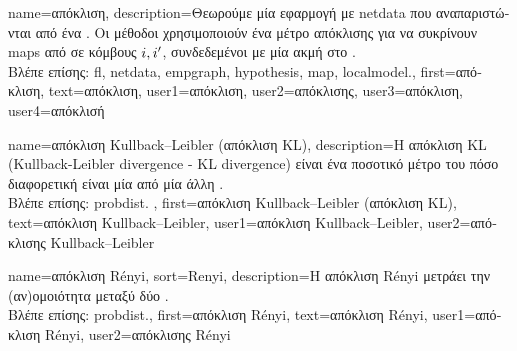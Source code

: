 {name={\foreignlanguage{greek}{απόκλιση}},
	description={\foreignlanguage{greek}{Θεωρούμε μία εφαρμογή} 
		 \foreignlanguage{greek}{με} \gls{netdata} \foreignlanguage{greek}{που αναπαριστώνται από ένα}
		. \foreignlanguage{greek}{Οι μέθοδοι}  \foreignlanguage{greek}{χρησιμοποιούν 
		ένα μέτρο απόκλισης για να συκρίνουν} \gls{map}s  \foreignlanguage{greek}{από}  
		\foreignlanguage{greek}{σε κόμβους} $i,i'$, \foreignlanguage{greek}{συνδεδεμένοι με μία ακμή στο} . \\
		\foreignlanguage{greek}{Βλέπε επίσης:} \gls{fl}, \gls{netdata}, \gls{empgraph}, \gls{hypothesis}, \gls{map}, \gls{localmodel}.},
	first={\foreignlanguage{greek}{απόκλιση}},
	text={\foreignlanguage{greek}{απόκλιση}},
	user1={\foreignlanguage{greek}{απόκλιση}}, %
	user2={\foreignlanguage{greek}{απόκλισης}}, %
	user3={\foreignlanguage{greek}{απόκλιση}}, %
	user4={\foreignlanguage{greek}{απόκλισή}} %
}

 {name={\foreignlanguage{greek}{απόκλιση} Kullback–Leibler (\foreignlanguage{greek}{απόκλιση} KL)}, 
 	description={\foreignlanguage{greek}{Η απόκλιση} 
		KL (Kullback-Leibler divergence - KL divergence) \foreignlanguage{greek}{είναι ένα ποσοτικό μέτρο του πόσο διαφορετική 
		είναι μία}  \foreignlanguage{greek}{από μία άλλη} \cite{coverthomas}.\\
		\foreignlanguage{greek}{Βλέπε επίσης:} \gls{probdist}. },
 	first={\foreignlanguage{greek}{απόκλιση} Kullback–Leibler (\foreignlanguage{greek}{απόκλιση} KL)},
	text={\foreignlanguage{greek}{απόκλιση} Kullback–Leibler},
	user1={\foreignlanguage{greek}{απόκλιση} Kullback–Leibler}, %
  	user2={\foreignlanguage{greek}{απόκλισης} Kullback–Leibler} %
}

{name={\foreignlanguage{greek}{απόκλιση} R\'enyi}, 
	sort={Renyi},
	description={\foreignlanguage{greek}{Η απόκλιση} R\'enyi 
		\foreignlanguage{greek}{μετράει την (αν)ομοιότητα μεταξύ δύο}  \cite{RenyiInfo95}.\\
		\foreignlanguage{greek}{Βλέπε επίσης:} \gls{probdist}.}, 
	first={\foreignlanguage{greek}{απόκλιση} R\'enyi},
	text={\foreignlanguage{greek}{απόκλιση} R\'enyi},
	user1={\foreignlanguage{greek}{απόκλιση} R\'enyi}, %
	user2={\foreignlanguage{greek}{απόκλισης} R\'enyi} %
} 

